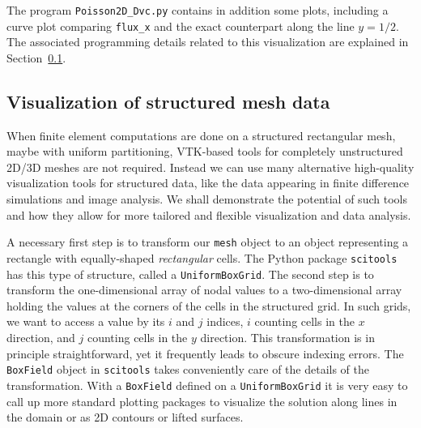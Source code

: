 The program {\fontsize{10pt}{10pt}\verb!Poisson2D_Dvc.py!} contains in addition some plots,
including a curve plot
comparing {\fontsize{10pt}{10pt}\verb!flux_x!} and the exact counterpart along the line $y=1/2$.
The associated programming details related to this visualization
are explained in Section~\ref{langtangen:structviz}.

\subsection{Visualization of structured mesh data}
\label{langtangen:structviz}

When finite element computations are done on a structured rectangular
mesh, maybe with uniform partitioning, VTK-based tools for completely
unstructured 2D/3D meshes are not required.  Instead we can use
many alternative high-quality
visualization tools for structured data, like the data appearing in
finite difference simulations and image analysis.  We shall
demonstrate the potential of such tools and how they allow for
more tailored and flexible visualization and data analysis.

A necessary first step is to transform our {\fontsize{10pt}{10pt}\texttt{mesh}} object to an
object representing a rectangle with equally-shaped \emph{rectangular}
cells.  The Python package {\fontsize{10pt}{10pt}\texttt{scitools}} has this type of structure,
called a {\fontsize{10pt}{10pt}\texttt{UniformBoxGrid}}. The second step is to transform the
one-dimensional array of nodal values to a two-dimensional array
holding the values at the corners of the cells in the structured
grid. In such grids, we want to access a value by its $i$ and $j$
indices, $i$ counting cells in the $x$ direction, and $j$ counting
cells in the $y$ direction.  This transformation is in principle
straightforward, yet it frequently leads to obscure indexing
errors. The {\fontsize{10pt}{10pt}\texttt{BoxField}} object in {\fontsize{10pt}{10pt}\texttt{scitools}} takes conveniently
care of the details of the transformation.  With a {\fontsize{10pt}{10pt}\texttt{BoxField}}
defined on a {\fontsize{10pt}{10pt}\texttt{UniformBoxGrid}} it is very easy to call up more
standard plotting packages to visualize the solution along lines in
the domain or as 2D contours or lifted surfaces.

